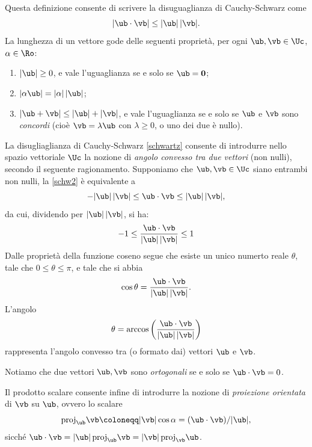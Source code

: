 Questa definizione consente di scrivere la disuguaglianza di
Cauchy-Schwarz come
\begin{equation}\label{schw2}
	|\ub\cdot\vb|\leq |\ub|\,|\vb|.
\end{equation}
La lunghezza di un vettore gode delle seguenti proprietà, per ogni
$\ub,\vb\in\Uc$, $\alpha\in\Ro$:
\begin{enumerate}
	\item $|\ub|\geq 0$, e vale l'uguaglianza se e solo se $\ub=\mathbf{0}$;
	\item $|\alpha\ub|=|\alpha|\,|\ub|$;
	\item $|\ub+\vb|\leq |\ub|+|\vb|$, e vale l'uguaglianza se e solo se
	$\ub$ e $\vb$ sono \emph{concordi} (cioè $\vb=\lambda\ub$ con
	$\lambda\ge0$, o uno dei due è nullo).
\end{enumerate}

\medskip

La disugliaglianza di Cauchy-Schwarz \eqref{schwartz} consente di introdurre nello spazio vettoriale $\Uc$ la nozione di \textit{angolo convesso tra due vettori} (non nulli), secondo
il seguente ragionamento. Supponiamo
che $\ub,\vb\in \Uc$  siano entrambi non nulli, la \eqref{schw2} è equivalente a 
\begin{equation}
-|\ub|\,|\vb|\leq \ub\cdot \vb\leq |\ub|\,|\vb|,
\end{equation}
da cui, dividendo per $|\ub|\,|\vb|$, si ha:
\begin{equation}
-1\leq \frac{\ub\cdot \vb}{|\ub|\,|\vb|}\leq 1
\end{equation}
Dalle proprietà della funzione coseno segue che esiste un unico numerto reale $\theta$, tale che $0\leq\theta\leq \pi$, e tale che si abbia
\begin{equation}
	\cos\theta=\frac{\ub\cdot \vb}{|\ub|\,|\vb|}.
\end{equation}
L'angolo 
\begin{equation}
	\theta=\arccos\left(    \frac{\ub\cdot \vb}{|\ub|\,|\vb|}\right)
\end{equation}
rappresenta l'angolo convesso tra (o formato dai) vettori $\ub$ e $\vb$. 

Notiamo che due vettori $\ub, \vb$ sono \textit{ortogonali} se e solo se $\ub\cdot\vb=0$.

Il prodotto scalare consente infine di introdurre la nozione di \textit{ proiezione orientata} di $\vb$ su $\ub$, ovvero lo scalare
\begin{equation}
\mathrm{proj}_{\ub}\vb\coloneqq|\vb|\cos\alpha = (\ub \cdot \vb)/|\ub|,
\end{equation}
sicché 	$\ub \cdot \vb = |\ub|\,\mathrm{proj}_{\ub}\vb
= |\vb|\,\mathrm{proj}_{\vb}\ub$.



